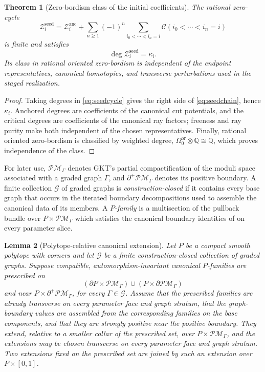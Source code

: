 \documentclass[11pt]{amsart}
\newtheorem{theorem}{Theorem}[section]
\newtheorem{lemma}[theorem]{Lemma}
\theoremstyle{definition}
\theoremstyle{remark}
\newcommand{\QQ}{\mathbb{Q}}
\begin{document}
\begin{theorem}[Zero-bordism class of the initial coefficients]
\label{thm:seedcascade}
The rational zero-cycle
\begin{equation}
\label{eq:seedcycle}
 \mathcal Z_i^{\mathrm{seed}}
 =\mathcal Z_i^{\mathrm{anc}}
 +\sum_{n\ge1}(-1)^n
   \sum_{i_0<\cdots<i_n=i}\mathcal C(i_0<\cdots<i_n=i)
\end{equation}
is finite and satisfies
\[
 \deg\mathcal Z_i^{\mathrm{seed}}=\kappa_i.
\]
Its class in rational oriented zero-bordism is independent of the endpoint
representatives, canonical homotopies, and transverse perturbations used in
the staged realization.
\end{theorem}

\begin{proof}
Taking degrees in \eqref{eq:seedcycle} gives the right side of
\eqref{eq:seedchain}, hence $\kappa_i$.
Anchored degrees are coefficients of the canonical cut potentials, and the
critical degrees are coefficients of the canonical ray factors; freeness and
ray purity make both independent of the chosen representatives.  Finally,
rational oriented zero-bordism is classified by weighted degree,
$\Omega^{\mathrm{or}}_0\otimes\QQ\cong\QQ$, which proves independence of the
class.  \qedhere
\end{proof}

For later use, $\mathcal{PM}_\Gamma$ denotes GKT's partial compactification of
the moduli space associated with a graded graph $\Gamma$, and
$\partial^+\mathcal{PM}_\Gamma$ denotes its positive boundary.  A finite
collection $\mathcal G$ of graded graphs is \emph{construction-closed} if it
contains every base graph that occurs in the iterated boundary decompositions
used to assemble the canonical data of its members.  A \emph{$P$-family} is a
multisection of the pullback bundle over
$P\times\mathcal{PM}_\Gamma$ which satisfies the canonical boundary identities
of \cite[Def.~3.22]{GKT} on every parameter slice.

\begin{lemma}[Polytope-relative canonical extension]
\label{lem:polytopeextension}
Let $P$ be a compact smooth polytope with corners and let $\mathcal G$ be a
finite construction-closed collection of graded graphs.  Suppose compatible,
automorphism-invariant canonical $P$-families are prescribed on
\[
 (\partial P\times\mathcal{PM}_\Gamma)
 \cup(P\times\partial\mathcal{PM}_\Gamma)
\]
and near $P\times\partial^+\mathcal{PM}_\Gamma$, for every $\Gamma\in\mathcal G$.
Assume that the prescribed families are already transverse on every parameter
face and graph stratum, that the graph-boundary values are assembled from the
corresponding families on the base components, and that they are strongly
positive near the positive boundary.  They extend, relative to a smaller
collar of the prescribed set, over $P\times\mathcal{PM}_\Gamma$, and the
extensions may be chosen transverse on every parameter face and graph
stratum.  Two extensions fixed on the prescribed set are joined by such an
extension over $P\times[0,1]$.
\end{lemma}
\end{document}
